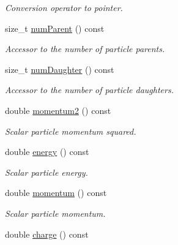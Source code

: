 \begin{DoxyCompactItemize}
\begin{DoxyCompactList}\small\item\em Conversion operator to pointer. \item\end{DoxyCompactList}\item 
size\_\-t \hyperlink{class_d_d4hep_1_1_simulation_1_1_geant4_particle_handle_ae68eea3c5bc4250c46597919ef3336d7}{numParent} () const 
\begin{DoxyCompactList}\small\item\em Accessor to the number of particle parents. \item\end{DoxyCompactList}\item 
size\_\-t \hyperlink{class_d_d4hep_1_1_simulation_1_1_geant4_particle_handle_a0ad8ec42843f9dca533a3db4049b00c0}{numDaughter} () const 
\begin{DoxyCompactList}\small\item\em Accessor to the number of particle daughters. \item\end{DoxyCompactList}\item 
double \hyperlink{class_d_d4hep_1_1_simulation_1_1_geant4_particle_handle_a5c8126955d5ce8941fca779c2b7b4139}{momentum2} () const 
\begin{DoxyCompactList}\small\item\em Scalar particle momentum squared. \item\end{DoxyCompactList}\item 
double \hyperlink{class_d_d4hep_1_1_simulation_1_1_geant4_particle_handle_a1f36d76d895f9e7eb7489db893d7eb8a}{energy} () const 
\begin{DoxyCompactList}\small\item\em Scalar particle energy. \item\end{DoxyCompactList}\item 
double \hyperlink{class_d_d4hep_1_1_simulation_1_1_geant4_particle_handle_a714e81dfd7fbc89bf31d65d7eecdbb7e}{momentum} () const 
\begin{DoxyCompactList}\small\item\em Scalar particle momentum. \item\end{DoxyCompactList}\item 
double \hyperlink{class_d_d4hep_1_1_simulation_1_1_geant4_particle_handle_a018804e5c0cda1d31a032aedb900c960}{charge} () const 

\end{DoxyCompactItemize}
